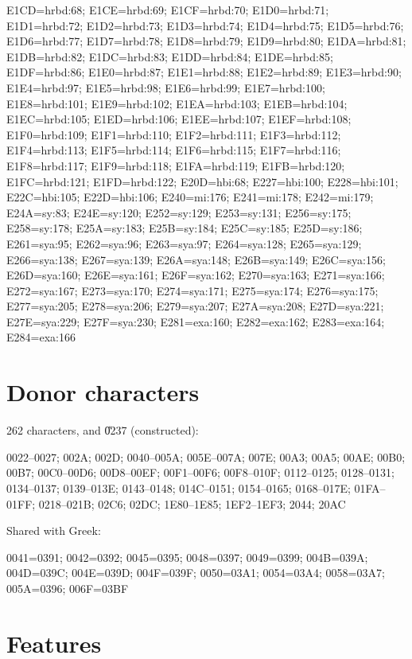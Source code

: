 E1CD=hrbd:68; E1CE=hrbd:69; E1CF=hrbd:70; E1D0=hrbd:71; E1D1=hrbd:72;
E1D2=hrbd:73; E1D3=hrbd:74; E1D4=hrbd:75; E1D5=hrbd:76; E1D6=hrbd:77;
E1D7=hrbd:78; E1D8=hrbd:79; E1D9=hrbd:80; E1DA=hrbd:81; E1DB=hrbd:82;
E1DC=hrbd:83; E1DD=hrbd:84; E1DE=hrbd:85; E1DF=hrbd:86; E1E0=hrbd:87;
E1E1=hrbd:88; E1E2=hrbd:89; E1E3=hrbd:90; E1E4=hrbd:97; E1E5=hrbd:98;
E1E6=hrbd:99; E1E7=hrbd:100; E1E8=hrbd:101; E1E9=hrbd:102; E1EA=hrbd:103;
E1EB=hrbd:104; E1EC=hrbd:105; E1ED=hrbd:106; E1EE=hrbd:107; E1EF=hrbd:108;
E1F0=hrbd:109; E1F1=hrbd:110; E1F2=hrbd:111; E1F3=hrbd:112; E1F4=hrbd:113;
E1F5=hrbd:114; E1F6=hrbd:115; E1F7=hrbd:116; E1F8=hrbd:117; E1F9=hrbd:118;
E1FA=hrbd:119; E1FB=hrbd:120; E1FC=hrbd:121; E1FD=hrbd:122; E20D=hbi:68;
E227=hbi:100; E228=hbi:101; E22C=hbi:105; E22D=hbi:106; E240=mi:176;
E241=mi:178; E242=mi:179; E24A=sy:83; E24E=sy:120; E252=sy:129; E253=sy:131;
E256=sy:175; E258=sy:178; E25A=sy:183; E25B=sy:184; E25C=sy:185; E25D=sy:186;
E261=sya:95; E262=sya:96; E263=sya:97; E264=sya:128; E265=sya:129;
E266=sya:138; E267=sya:139; E26A=sya:148; E26B=sya:149; E26C=sya:156;
E26D=sya:160; E26E=sya:161; E26F=sya:162; E270=sya:163; E271=sya:166;
E272=sya:167; E273=sya:170; E274=sya:171; E275=sya:174; E276=sya:175;
E277=sya:205; E278=sya:206; E279=sya:207; E27A=sya:208; E27D=sya:221;
E27E=sya:229; E27F=sya:230; E281=exa:160; E282=exa:162; E283=exa:164;
E284=exa:166\par

\section{Donor characters}\label{app:donor}

262 characters, and \U{0237} (constructed):

\raggedright\small 0022--0027; 002A; 002D; 0040--005A; 005E--007A; 007E; 00A3;
00A5; 00AE; 00B0; 00B7; 00C0--00D6; 00D8--00EF; 00F1--00F6; 00F8--010F;
0112--0125; 0128--0131; 0134--0137; 0139--013E; 0143--0148; 014C--0151;
0154--0165; 0168--017E; 01FA--01FF; 0218--021B; 02C6; 02DC; 1E80--1E85;
1EF2--1EF3; 2044; 20AC\par

Shared with Greek:
\raggedright\small 0041=0391; 0042=0392; 0045=0395; 0048=0397; 0049=0399;
004B=039A; 004D=039C; 004E=039D; 004F=039F; 0050=03A1; 0054=03A4; 0058=03A7;
005A=0396; 006F=03BF\par

\section{Features}\label{app:features}


